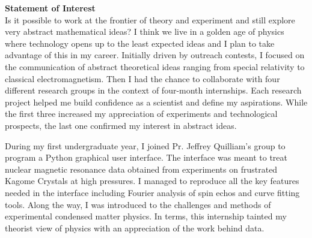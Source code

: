 \documentclass[11pt,a4paper,roman, total={5in, 4in}]{moderncv}
\begin{document}
{\huge \textbf{Statement of Interest}}\\




Is it possible to work at the frontier of theory and experiment and still explore very abstract mathematical ideas? I think we live in a golden age of physics where technology opens up to the least expected ideas and I plan to take advantage of this in my career. Initially driven by outreach contests, I focused on the communication of abstract theoretical ideas ranging from special relativity to classical electromagnetism. Then I had the chance to collaborate with four different research groups in the context of four-month internships. Each research project helped me build confidence as a scientist and define my aspirations. While the first three increased my appreciation of experiments and technological prospects, the last one confirmed my interest in abstract ideas. 
\vspace{0.5cm}

During my first undergraduate year, I joined Pr. Jeffrey Quilliam's group to program a Python graphical user interface. The interface was meant to treat nuclear magnetic resonance data obtained from experiments on frustrated Kagome Crystals at high pressures. I managed to reproduce all the key features needed in the interface including Fourier analysis of spin echos and curve fitting tools. Along the way, I was introduced to the challenges and methods of experimental condensed matter physics. In terms, this internship tainted my theorist view of physics with an appreciation of the work behind data.\vspace{0.5cm}
\end{document}
